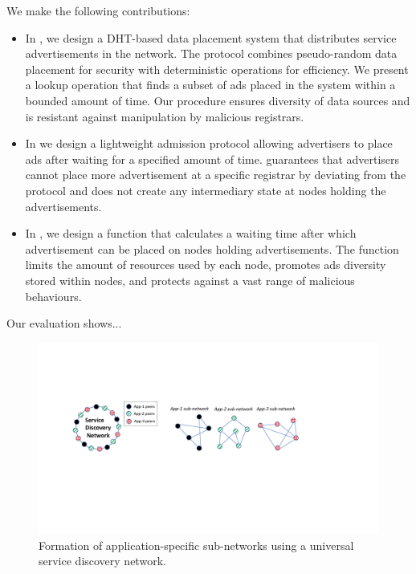  We make the following contributions:
\begin{itemize}
    \item In , we design a DHT-based data placement system that distributes service advertisements in the network. The protocol combines pseudo-random data placement for security  with deterministic operations for efficiency. We present a lookup operation that finds a subset of ads placed in the system within a bounded amount of time. Our procedure ensures diversity of data sources and is resistant against manipulation by malicious registrars. 
    \item In  we design a lightweight admission protocol allowing advertisers to place ads after waiting for a specified amount of time. %
    \sysname guarantees that advertisers cannot place more advertisement at a specific registrar by deviating from the protocol %
    and does not create any intermediary state at nodes holding the advertisements.
    
    \item In , we design a function that calculates a waiting time after which advertisement can be placed on nodes holding advertisements. The function limits the amount of resources used by each node, promotes ads diversity stored within nodes, and protects against a vast range of malicious behaviours. 
\end{itemize}

Our evaluation shows...


\begin{figure}
    \includegraphics[width=1\linewidth]{img/subnetwork}
    \caption{Formation of application-specific sub-networks using a universal service discovery network.}
    \label{fig:subnetwork}
\end{figure}




